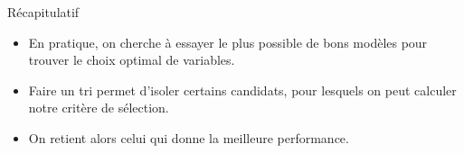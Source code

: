 \documentclass[
  ignorenonframetext,
]{beamer}
\providecommand{\tightlist}{%
  \setlength{\itemsep}{0pt}\setlength{\parskip}{0pt}}
\begin{document}
\begin{frame}{Récapitulatif}
\protect{}\label{ruxe9capitulatif-4}
\begin{itemize}
\tightlist
\item
  En pratique, on cherche à essayer le plus possible de bons modèles
  pour trouver le choix optimal de variables.
\item
  Faire un tri permet d'isoler certains candidats, pour lesquels on peut
  calculer notre critère de sélection.
\item
  On retient alors celui qui donne la meilleure performance.
\end{itemize}
\end{frame}
\end{document}
